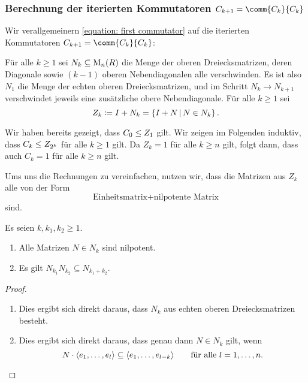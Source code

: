 \subsubsection*{Berechnung der iterierten Kommutatoren $C_{k+1} = \comm{C_k}{C_k}$}

Wir verallgemeinern \eqref{equation: first commutator} auf die iterierten Kommutatoren $C_{k+1} = \comm{C_k}{C_k}$:

Für alle $k \geq 1$ sei $N_k \subseteq \operatorname{M}_{n}(R)$ die Menge der oberen Dreiecksmatrizen, deren Diagonale sowie  $(k-1)$ oberen Nebendiagonalen alle verschwinden.
Es ist also $N_1$ die Menge der echten oberen Dreiecksmatrizen, und im Schritt $N_k \to N_{k+1}$ verschwindet jeweils eine zusätzliche obere Nebendiagonale.
Für alle $k \geq 1$ sei
\[
            Z_k
  \coloneqq I + N_k
  =         \{ I + N \suchthat N \in N_k \}\,.
\]

Wir haben bereits gezeigt, dass $C_0 \leq Z_1$ gilt.
Wir zeigen im Folgenden induktiv, dass $C_k \leq Z_{2^k}$ für alle $k \geq 1$ gilt.
Da $Z_k = 1$ für alle $k \geq n$ gilt, folgt dann, dass auch $C_k = 1$ für alle $k \geq n$ gilt.

Ums uns die Rechnungen zu vereinfachen, nutzen wir, dass die Matrizen aus $Z_k$ alle von der Form
\[
  \text{Einheitsmatrix} + \text{nilpotente Matrix}
\]
sind.

\begin{lemma}
  Es seien $k, k_1, k_2 \geq 1$.
  \begin{enumerate}
    \item
      Alle Matrizen $N \in N_k$ sind nilpotent.
    \item
      Es gilt $N_{k_1} N_{k_2} \subseteq N_{k_1 + k_2}$.
  \end{enumerate}
\end{lemma}
 
\begin{proof}
  \leavevmode
  \begin{enumerate}
    \item
      Dies ergibt sich direkt daraus, dass $N_k$ aus echten oberen Dreiecksmatrizen besteht.
    \item
      Dies ergibt sich direkt daraus, dass genau dann $N \in N_k$ gilt, wenn
      \[
                  N \cdot \langle e_1, \dotsc, e_l\rangle
        \subseteq \langle e_1, \dotsc, e_{l-k}\rangle
        \qquad    \text{für alle $l = 1, \dotsc, n$}.
        \qedhere
      \]
  \end{enumerate}
\end{proof}

